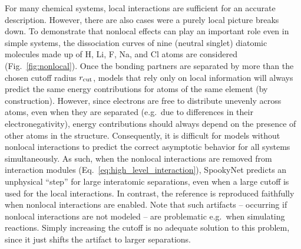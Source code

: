 \documentclass[%
superscriptaddress,
reprint,
nofootinbib,
amsmath,amssymb,amsfonts,
floatfix,
altaffilletter,
showkeys,
]{revtex4-2}
\newcommand{\nn}{SpookyNet}
\begin{document}
For many chemical systems, local interactions are sufficient for an accurate description. However, there are also cases were a purely local picture breaks down. To demonstrate that nonlocal effects can play an important role even in simple systems, the dissociation curves of nine (neutral singlet) diatomic molecules made up of H, Li, F, Na, and Cl atoms are considered (Fig.~\ref{fig:nonlocal}). Once the bonding partners are separated by more than the chosen cutoff radius $r_{\rm cut}$, models that rely only on local information will always predict the same energy contributions for atoms of the same element (by construction). However, since electrons are free to distribute unevenly across atoms, even when they are separated (e.g.\ due to differences in their electronegativity), energy contributions should always depend on the presence of other atoms in the structure. Consequently, it is difficult for models without nonlocal interactions to predict the correct asymptotic behavior for all systems simultaneously. As such, when the nonlocal interactions are removed from interaction modules (Eq.~\ref{eq:high_level_interaction}), \nn{} predicts an unphysical ``step'' for large interatomic separations, even when a large cutoff is used for the local interactions. In contrast, the reference is reproduced faithfully when nonlocal interactions are enabled. Note that such artifacts -- occurring if nonlocal interactions are not modeled -- are problematic e.g.\ when simulating reactions. Simply increasing the cutoff is no adequate solution to this problem, since it just shifts the artifact to larger separations. %
\end{document}
